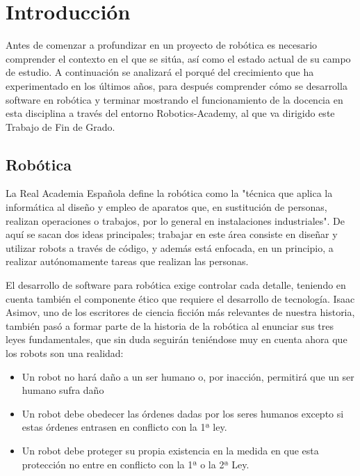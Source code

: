 \documentclass[12pt,spanish,chapterprefix, numbers=noenddot]{book}
\numberwithin{equation}{section}
\numberwithin{figure}{section}
\begin{document}
\tableofcontents{}

\mainmatter

\chapter{Introducción}
Antes de comenzar a profundizar en un proyecto de robótica es necesario comprender el contexto en el que se sitúa, así como el estado actual de su campo de estudio. A continuación se analizará el porqué del crecimiento que ha experimentado en los últimos años, para después comprender cómo se desarrolla software en robótica y terminar mostrando el funcionamiento de la docencia en esta disciplina a través del entorno Robotics-Academy, al que va dirigido este Trabajo de Fin de Grado. 

\section{Robótica}
La Real Academia Española define la robótica como la "técnica que aplica la informática al diseño y empleo de aparatos que, en sustitución de personas, realizan operaciones o trabajos, por lo general en instalaciones industriales". De aquí se sacan dos ideas principales; trabajar en este área consiste en diseñar y utilizar robots a través de código, y además está enfocada, en un principio, a realizar autónomamente tareas que realizan las personas. %

El desarrollo de software para robótica exige controlar cada detalle, teniendo en cuenta también el componente ético que requiere el desarrollo de tecnología. Isaac Asimov, uno de los escritores de ciencia ficción más relevantes de nuestra historia, también pasó a formar parte de la historia de la robótica al enunciar sus tres leyes fundamentales, que sin duda seguirán teniéndose muy en cuenta ahora que los robots son una realidad:
\begin{itemize}
    \item Un robot no hará daño a un ser humano o, por inacción, permitirá que un ser humano sufra daño
    \item Un robot debe obedecer las órdenes dadas por los seres humanos excepto si estas órdenes entrasen en conflicto con la 1ª ley.
    \item Un robot debe proteger su propia existencia en la medida en que esta protección no entre en conflicto con la 1ª o la 2ª Ley.
\end{itemize}
\end{document}
